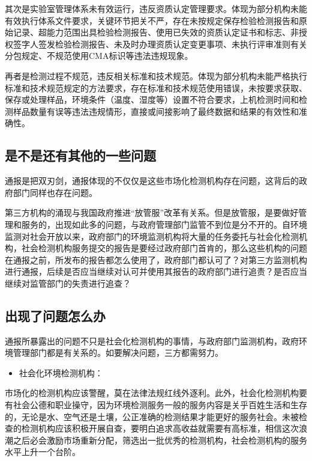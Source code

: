 \documentclass[
]{book}
\providecommand{\tightlist}{%
  \setlength{\itemsep}{0pt}\setlength{\parskip}{0pt}}
\begin{document}
其次是实验室管理体系未有效运行，违反资质认定管理要求。体现为部分机构未能有效执行体系文件要求，关键环节把关不严，存在未按规定保存检验检测报告和原始记录、超能力范围出具检验检测报告、使用已失效的资质认定证书和标志、非授权签字人签发检验检测报告、未及时办理资质认定变更事项、未执行评审准则有关分包规定、不规范使用CMA标识等违法违规现象。

再者是检测过程不规范，违反相关标准和技术规范。体现为部分机构未能严格执行标准和技术规范规定的方法要求，存在标准和技术规范使用错误，未按要求获取、保存或处理样品，环境条件（温度、湿度等）设置不符合要求，上机检测时间和检测样品数量有误等违法违规情形，直接或间接影响了最终数据和结果的有效性和准确性。

\hypertarget{ux662fux4e0dux662fux8fd8ux6709ux5176ux4ed6ux7684ux4e00ux4e9bux95eeux9898}{%
\subsection{是不是还有其他的一些问题}\label{ux662fux4e0dux662fux8fd8ux6709ux5176ux4ed6ux7684ux4e00ux4e9bux95eeux9898}}

通报是把双刃剑，通报体现的不仅仅是这些市场化检测机构存在问题，这背后的政府部门同样也存在问题。

第三方机构的涌现与我国政府推进``放管服''改革有关系。但是放管服，是要做好管理和服务的，出现如此多的问题，与政府管理部门监管不到位是分不开的。自环境监测对社会开放以来，政府部门的环境监测机构将大量的任务委托与社会化检测机构，社会检测机构服务提交的报告是要经过政府部门首肯的，那么这些机构的问题在通报之前，所发布的报告都怎么使用了，政府部门都认可了？对第三方监测机构进行通报，后续是否应当继续对认可并使用其报告的政府部门进行追责？是否应当继续对监管部门的失责进行追查？

\hypertarget{ux51faux73b0ux4e86ux95eeux9898ux600eux4e48ux529e}{%
\subsection{出现了问题怎么办}\label{ux51faux73b0ux4e86ux95eeux9898ux600eux4e48ux529e}}

通报所暴露出的问题不只是社会化检测机构的事情，与政府部门监测机构，政府环境管理部门都是有关系的。如要解决问题，三方都需努力。

\begin{itemize}
\tightlist
\item
  社会化环境检测机构：
\end{itemize}

市场化的检测机构应该警醒，莫在法律法规红线外逐利。此外，社会化检测机构要有社会公德和职业操守，因为环境检测服务一般的服务内容是关乎百姓生活和生存的，无论是水、空气还是土壤，公正准确的检测结果才能更好的服务社会。未被检查的检测机构应该积极开展自查，要明白追求高收益就需要有高标准，相信这次浪潮之后必会激励市场重新分配，筛选出一批优秀的检测机构，社会检测机构的服务水平上升一个台阶。
\end{document}
